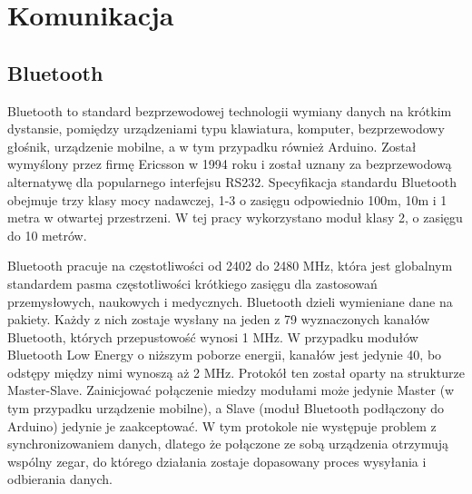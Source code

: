 \section{Komunikacja}
\subsection{Bluetooth}%
Bluetooth to standard bezprzewodowej technologii wymiany danych na krótkim dystansie, pomiędzy urządzeniami typu klawiatura, komputer, bezprzewodowy głośnik, urządzenie mobilne, a w tym przypadku również Arduino. Został wymyślony przez firmę Ericsson w 1994 roku i został uznany za bezprzewodową alternatywę dla popularnego interfejsu RS232. Specyfikacja standardu Bluetooth obejmuje trzy klasy mocy nadawczej, 1-3 o zasięgu odpowiednio 100m, 10m i 1 metra w otwartej przestrzeni. W tej pracy wykorzystano moduł klasy 2, o zasięgu do 10 metrów.

Bluetooth pracuje na częstotliwości od 2402 do 2480 MHz, która jest globalnym standardem pasma częstotliwości krótkiego zasięgu dla zastosowań przemysłowych, naukowych i medycznych. Bluetooth dzieli wymieniane dane na pakiety. Każdy z nich zostaje wysłany na jeden z 79 wyznaczonych kanałów Bluetooth, których przepustowość wynosi 1 MHz. W przypadku modułów Bluetooth Low Energy o niższym poborze energii, kanałów jest jedynie 40, bo odstępy między nimi wynoszą aż 2 MHz. Protokół ten został oparty na strukturze Master-Slave. Zainicjować połączenie miedzy modułami może jedynie Master (w tym przypadku urządzenie mobilne), a Slave (moduł Bluetooth podłączony do Arduino) jedynie je zaakceptować. W tym protokole nie występuje problem z synchronizowaniem danych, dlatego że połączone ze sobą urządzenia otrzymują wspólny zegar, do którego działania zostaje dopasowany proces wysyłania i odbierania danych.


